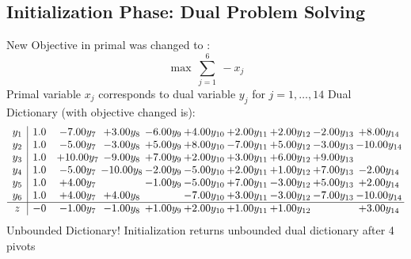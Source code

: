 \documentclass[9pt]{article}
\begin{document}
\subsection{Initialization Phase: Dual Problem Solving}
New Objective in primal was changed to : \[ \max\ \sum_{j=1}^{6}\ - x_j \] 
Primal variable $x_j$ corresponds to dual variable $y_j$ for $j = 1,\ldots,14$
Dual Dictionary (with objective changed is): 
\[\begin{array}{c| c c@{\hskip 2pt} c@{\hskip 2pt} c@{\hskip 2pt} c@{\hskip 2pt} c@{\hskip 2pt} c@{\hskip 2pt} c@{\hskip 2pt} c@{\hskip 2pt} }
 y_{1}   &  1.0 & -7.00 y_{7} & +  3.00 y_{8} & -6.00 y_{9} & +  4.00 y_{10} & +  2.00 y_{11} & +  2.00 y_{12} & -2.00 y_{13} & +  8.00 y_{14}\\
 y_{2}   &  1.0 & -5.00 y_{7} & -3.00 y_{8} & +  5.00 y_{9} & +  8.00 y_{10} & -7.00 y_{11} & +  5.00 y_{12} & -3.00 y_{13} & -10.00 y_{14}\\
 y_{3}   &  1.0 & + 10.00 y_{7} & -9.00 y_{8} & +  7.00 y_{9} & +  2.00 y_{10} & +  3.00 y_{11} & +  6.00 y_{12} & +  9.00 y_{13} &   \\
 y_{4}   &  1.0 & -5.00 y_{7} & -10.00 y_{8} & -2.00 y_{9} & -5.00 y_{10} & +  2.00 y_{11} & +  1.00 y_{12} & +  7.00 y_{13} & -2.00 y_{14}\\
 y_{5}   &  1.0 & +  4.00 y_{7} &   & -1.00 y_{9} & -5.00 y_{10} & +  7.00 y_{11} & -3.00 y_{12} & +  5.00 y_{13} & +  2.00 y_{14}\\
 y_{6}   &  1.0 & +  4.00 y_{7} & +  4.00 y_{8} &   & -7.00 y_{10} & +  3.00 y_{11} & -3.00 y_{12} & -7.00 y_{13} & -10.00 y_{14}\\
\hline
z    &  -0 & -1.00 y_{7} & -1.00 y_{8} & +  1.00 y_{9} & +  2.00 y_{10} & +  1.00 y_{11} & +  1.00 y_{12} &   & +  3.00 y_{14}\\
\end{array}\]
Unbounded Dictionary!
Initialization returns unbounded dual dictionary after 4 pivots
\end{document}
